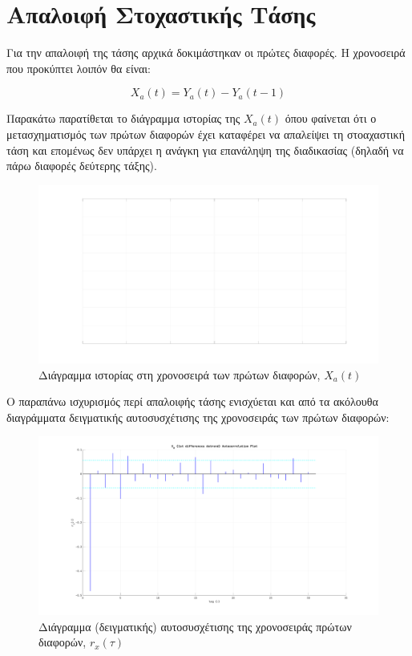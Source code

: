 \section{Απαλοιφή Στοχαστικής Τάσης}

Για την απαλοιφή της τάσης αρχικά δοκιμάστηκαν οι πρώτες διαφορές. Η χρονοσειρά που προκύπτει λοιπόν θα είναι:

\[ X_a(t) = Y_a(t) - Y_a(t-1) \]

Παρακάτω παρατίθεται το διάγραμμα ιστορίας της ${X_a(t)}$ όπου φαίνεται ότι ο μετασχηματισμός των πρώτων διαφορών έχει καταφέρει να απαλείψει τη στοαχαστική τάση και επομένως δεν υπάρχει η ανάγκη για επανάληψη της διαδικασίας (δηλαδή να πάρω διαφορές δεύτερης τάξης).

\begin{figure}[H]
    \begin{center}
        \includegraphics[width=\textwidth]{plots/xa_1st_differences_history.svg.pdf}
        \caption{Διάγραμμα ιστορίας στη χρονοσειρά των πρώτων διαφορών, \emph{${X_a(t)}$}}
        \label{fig:xa_1st_differences_history}
    \end{center}
\end{figure}

Ο παραπάνω ισχυρισμός περί απαλοιφής τάσης ενισχύεται και από τα ακόλουθα διαγράμματα δειγματικής αυτοσυσχέτισης της χρονοσειράς των πρώτων διαφορών:

\begin{figure}[H]
    \begin{center}
        \includegraphics[width=\textwidth]{plots/xa_1st_differences_autocorrelation.svg.pdf}
        \caption{Διάγραμμα (δειγματικής) αυτοσυσχέτισης της χρονοσειράς πρώτων διαφορών, $r_x(\tau)$}
        \label{fig:xa_1st_differences_autocorrelation}
    \end{center}
\end{figure}

